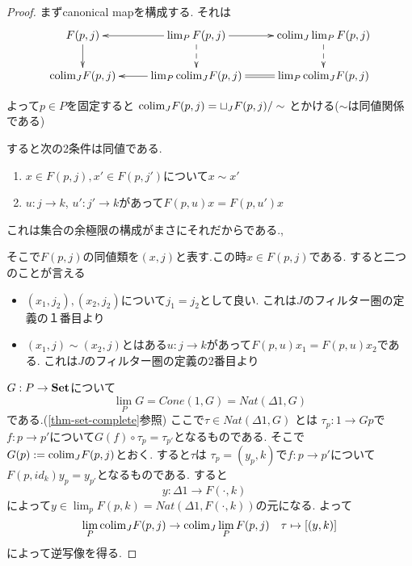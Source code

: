 \documentclass[dvipdfmx,a4paper,11pt]{report}
\newcommand{\colim}{{\rm colim}}
\theoremstyle{definition}
\begin{document}
\begin{proof}
まずcanonical mapを構成する.
それは
\begin{equation*}
\xymatrix@C=25pt@R=20pt{
F(p,j)\ar@{->}[d]
& \lim_{P} F(p,j)\ar@{-->}[d]\ar@{->}[l]\ar@{->}[r]
&\colim_{J}\lim_{P} F(p,j)\ar@{-->}[d]
\\
\colim_{J}F(p,j)
&\lim_{P}\colim_{J}F(p,j)\ar@{->}[l]
&\lim_{P}\colim_{J}F(p,j)\ar@{=}[l] \\   
}
\end{equation*}


よって$p \in P$を固定すると
$\colim_{J}F(p,j) = \sqcup_{J} F(p,j)/\sim$
とかける($\sim$は同値関係である)

すると次の2条件は同値である.
\begin{enumerate}
\item $x \in F(p,j), x' \in F(p,j')$について$x \sim x'$
\item $u : j \to k$, $u': j' \to k$があって$F(p,u)x = F(p,u')x$
\end{enumerate}
これは集合の余極限の構成がまさにそれだからである.,

そこで$F(p,j)$の同値類を$(x,j)$と表す.この時$x \in F(p,j)$である.
すると二つのことが言える
\begin{itemize}
\item $(x_1, j_2), (x_2, j_2)$について$j_1=j_2$として良い. これは$J$のフィルター圏の定義の１番目より
\item $(x_1, j)\sim (x_2, j)$とはある$u : j \to k$があって$F(p,u)x_1 =F(p,u)x_2$である.
 これは$J$のフィルター圏の定義の2番目より
\end{itemize}

$G : P \to {\bf Set}$について
$$
\lim_{P} G = Cone(1, G)=Nat(\Delta 1 , G)
$$
である.(\ref{thm-set-complete}参照)
ここで$\tau \in Nat(\Delta 1 , G)$
とは
$\tau_p: 1 \to Gp$で$f : p \to p'$について$G(f) \circ \tau_p = \tau_{p'}$となるものである. 
そこで$G(p):=\colim_{J}F(p,j)$とおく. すると$\tau$は
$\tau_p = (y_p, k)$で$f : p \to p'$について$F(p,id_{k})y_p = y_{p'}$となるものである.
すると
$$
y : \Delta 1 \to F(\cdot, k)
\quad
$$
によって$y \in \lim_{p}F(p,k)=Nat(\Delta 1 , F(\cdot, k))$の元になる.
よって
$$
\lim_{P} \colim_{J}F(p,j) \to \colim_{J} \lim_{P} F(p,j) 
\quad
\tau \mapsto [(y, k)]
$$
によって逆写像を得る. 

\end{proof}
\end{document}
